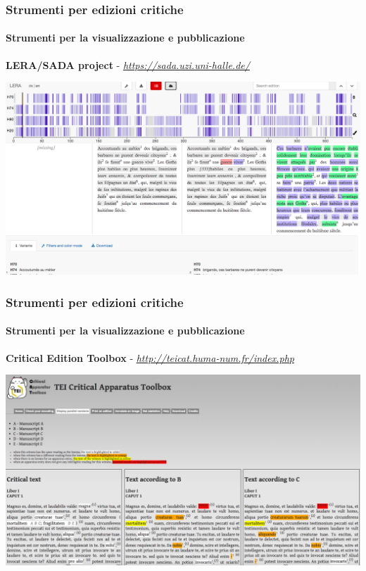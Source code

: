 \begin{frame}
    \frametitle{Strumenti per edizioni critiche}
    \framesubtitle{Strumenti per la visualizzazione e pubblicazione}
	\addtocounter{nframe}{1}
    \begin{center}
        \textbf{LERA/SADA project} - \textit{\url{https://sada.uzi.uni-halle.de/}}
    \end{center}
    \begin{center}
        \includegraphics[width=.95\textwidth]{imgs/lara.png}
	\end{center}
\end{frame}

\begin{frame}
    \frametitle{Strumenti per edizioni critiche}
    \framesubtitle{Strumenti per la visualizzazione e pubblicazione}
	\addtocounter{nframe}{1}
    \begin{center}
        \textbf{Critical Edition Toolbox} - \textit{\url{http://teicat.huma-num.fr/index.php}}
    \end{center}
    \begin{center}
        \includegraphics[width=.95\textwidth]{imgs/TEI-critical-app-toolbox.png}
	\end{center}
\end{frame}

